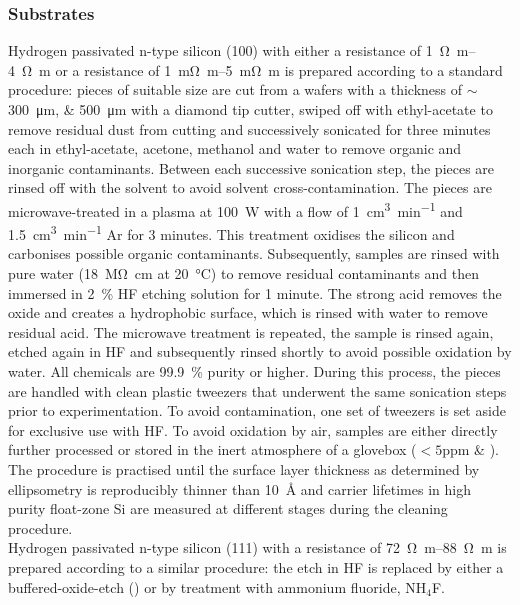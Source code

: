 \subsubsection{\sih{} Substrates}
Hydrogen passivated n-type silicon (100) with either a resistance of \SIrange{1}{4}{\ohm\metre} or a resistance of \SIrange{1}{5}{\milli\ohm\metre} is prepared according to a standard procedure: pieces of suitable size are cut from a wafers with a thickness of $\sim$\SIlist{300;500}{\micro\metre} with a diamond tip cutter, swiped off with ethyl-acetate to remove residual dust from cutting and successively sonicated for three minutes each in ethyl-acetate, acetone, methanol and water to remove organic and inorganic contaminants. Between each successive sonication step, the pieces are rinsed off with the  solvent to avoid solvent cross-contamination. The pieces are microwave-treated in a plasma at \SI{100}{\watt} with a flow of \SI{1}{\cubic\centi\metre\per\minute} \oxy{} and \SI{1.5}{\cubic\centi\metre\per\minute} Ar for 3 minutes. This treatment oxidises the silicon and carbonises possible organic contaminants. Subsequently, samples are rinsed with pure water (\SI{18}{\mega\ohm\centi\metre} at \SI{20}{\degreeCelsius}) to remove residual contaminants and then immersed in \SI{2}{\percent} HF etching solution for 1 minute. The strong acid removes the oxide and creates a hydrophobic \sih{} surface, which is rinsed with water to remove residual acid. The microwave treatment is repeated, the sample is rinsed again, etched again in HF and subsequently rinsed shortly to avoid possible oxidation by water. All chemicals are \SI{99.9}{\percent} purity or higher. During this process, the pieces are handled with clean plastic tweezers that underwent the same sonication steps prior to experimentation. To avoid contamination, one set of tweezers is set aside for exclusive use with HF. To avoid oxidation by air, samples are either directly further processed or stored in the inert atmosphere of a glovebox ($<\num{5}$ppm \oxy{} \& \water{}).\\
The procedure is practised until the surface layer thickness as determined by ellipsometry is reproducibly thinner than \SI{10}{\angstrom} and carrier lifetimes in high purity float-zone Si are measured at different stages during the cleaning procedure.\\
Hydrogen passivated n-type silicon (111) with a resistance of \SIrange{72}{88}{\ohm\metre} is prepared according to a similar procedure: the etch in HF is replaced by either a buffered-oxide-etch (\boe{}) or by treatment with ammonium fluoride, NH$_4$F.
